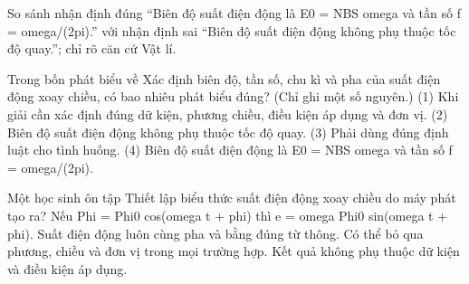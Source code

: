 \begin{bt}
So sánh nhận định đúng “Biên độ suất điện động là E0 = NBS omega và tần số f = omega/(2pi).” với nhận định sai “Biên độ suất điện động không phụ thuộc tốc độ quay.”; chỉ rõ căn cứ Vật lí.
\end{bt}

\begin{ex}
Trong bốn phát biểu về Xác định biên độ, tần số, chu kì và pha của suất điện động xoay chiều, có bao nhiêu phát biểu đúng? (Chỉ ghi một số nguyên.) (1) Khi giải cần xác định đúng dữ kiện, phương chiều, điều kiện áp dụng và đơn vị. (2) Biên độ suất điện động không phụ thuộc tốc độ quay. (3) Phải dùng đúng định luật cho tình huống. (4) Biên độ suất điện động là E0 = NBS omega và tần số f = omega/(2pi).
\end{ex}

\begin{ex}
Một học sinh ôn tập Thiết lập biểu thức suất điện động xoay chiều do máy phát tạo ra?
\choice
{\True Nếu Phi = Phi0 cos(omega t + phi) thì e = omega Phi0 sin(omega t + phi).}
{Suất điện động luôn cùng pha và bằng đúng từ thông.}
{Có thể bỏ qua phương, chiều và đơn vị trong mọi trường hợp.}
{Kết quả không phụ thuộc dữ kiện và điều kiện áp dụng.}
\end{ex}

